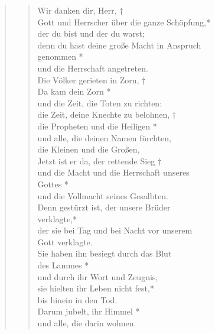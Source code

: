 \begin{quote}
\vspace{0.3cm}

\def\greinitialformat#1{{\fontsize{40}{40}\selectfont #1}}
\gresetfirstlineaboveinitial{\small \textcolor{red}{Ap 11;12}}{}
\setaboveinitialseparation{0.72mm}




\begin{verse}
 Wir danken dir, Herr, †\\
 Gott und Herrscher über die ganze Schöpfung,*\\
 der du bist und der du warst;\\
 \vin denn du hast deine große Macht in Anspruch\\ \vin  genommen *\\
 \vin und die Herrschaft angetreten. \\
 Die Völker gerieten in Zorn, †\\
 Da kam dein Zorn *\\
 und die Zeit, die Toten zu richten:\\
 \vin die Zeit, deine Knechte zu belohnen, †\\
 \vin die Propheten und die Heiligen *\\
 \vin  und alle, die deinen Namen fürchten, \\ \vin die Kleinen und die Großen, \\

 
 Jetzt ist er da, der rettende Sieg †\\
und die Macht und die Herrschaft unseres\\ Gottes *\\
und die Vollmacht seines Gesalbten.\\

\vin Denn gestürzt ist, der unsere Brüder\\ \vin  verklagte,*\\
\vin der sie bei Tag und bei Nacht vor unserem \\ \vin Gott verklagte.\\
Sie haben ihn besiegt durch das Blut\\ des Lammes *\\
und durch ihr Wort und Zeugnis,\\ 
\vin sie hielten ihr Leben nicht fest,*\\
\vin  bis hinein in den Tod.\\
Darum jubelt, ihr Himmel *\\
und alle, die darin wohnen.\\


\end{verse}

 
\end{quote}
\medskip
 
